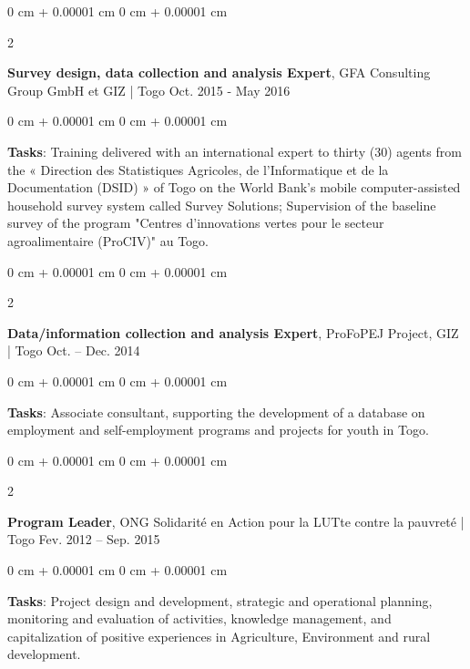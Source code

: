 \documentclass[10 pt, letterpaper]{article}
\newenvironment{onecolentry}{
    \begin{adjustwidth}{
        0 cm + 0.00001 cm
    }{
        0 cm + 0.00001 cm
    }
}{
    \end{adjustwidth}
} %
\newenvironment{twocolentry}[2][]{
    \onecolentry
    \def\secondColumn{#2}
    \setcolumnwidth{\fill, 4.5 cm}
    \begin{paracol}{2}
}{
    \switchcolumn \raggedleft \secondColumn
    \end{paracol}
    \endonecolentry
} %
\begin{document}
        \vspace{0.20 cm}

        \begin{twocolentry}{
            Oct. 2015 - May 2016
        }
            \textbf{Survey design, data collection and analysis Expert}, GFA Consulting Group GmbH et GIZ | Togo \end{twocolentry}

        \vspace{0.10 cm}
        \begin{onecolentry}
            \textbf{Tasks}: Training delivered with an international expert to thirty (30) agents from the « Direction des Statistiques Agricoles, de l'Informatique et de la Documentation (DSID) » of Togo on the World Bank's mobile computer-assisted household survey system called Survey Solutions; Supervision of the baseline survey of the program "Centres d'innovations vertes pour le secteur agroalimentaire (ProCIV)" au Togo.
        \end{onecolentry}
   
        \vspace{0.20 cm}

        \begin{twocolentry}{
            Oct. – Dec. 2014
        }
            \textbf{Data/information collection and analysis Expert}, ProFoPEJ Project, GIZ | Togo \end{twocolentry}

        \vspace{0.10 cm}
        \begin{onecolentry}
            \textbf{Tasks}: Associate consultant, supporting the development of a database on employment and self-employment programs and projects for youth in Togo.
        \end{onecolentry}

        \vspace{0.20 cm}

        \begin{twocolentry}{
            Fev. 2012 – Sep. 2015
        }
            \textbf{Program Leader}, ONG Solidarité en Action pour la LUTte contre la pauvreté | Togo\end{twocolentry}

        \vspace{0.10 cm}
        \begin{onecolentry}
            \textbf{Tasks}: Project design and development, strategic and operational planning, monitoring and evaluation of activities, knowledge management, and capitalization of positive experiences in Agriculture, Environment and rural development.
        \end{onecolentry}
      
\end{document}
